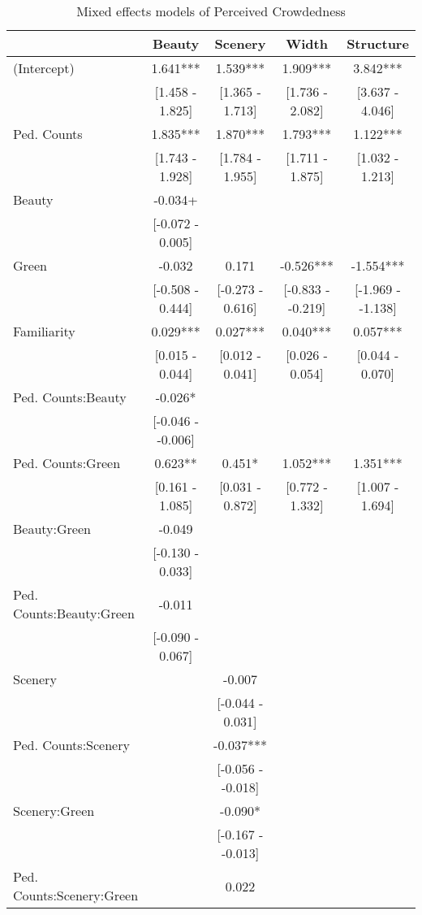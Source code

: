 \begin{table}

\caption{\label{tab:unnamed-chunk-11}Mixed effects models of Perceived Crowdedness \label{tab:models_perceived_crowds}}
\centering
\begin{tabular}[t]{lcccc}
\toprule
  & Beauty & Scenery & Width & Structure\\
\midrule
(Intercept) & 1.641*** & 1.539*** & 1.909*** & 3.842***\\
 & {}[1.458 - 1.825] & {}[1.365 - 1.713] & {}[1.736 - 2.082] & {}[3.637 - 4.046]\\
Ped. Counts & 1.835*** & 1.870*** & 1.793*** & 1.122***\\
 & {}[1.743 - 1.928] & {}[1.784 - 1.955] & {}[1.711 - 1.875] & {}[1.032 - 1.213]\\
Beauty & -0.034+ &  &  & \\
 & {}[-0.072 - 0.005] &  &  & \\
Green & -0.032 & 0.171 & -0.526*** & -1.554***\\
 & {}[-0.508 - 0.444] & {}[-0.273 - 0.616] & {}[-0.833 - -0.219] & {}[-1.969 - -1.138]\\
Familiarity & 0.029*** & 0.027*** & 0.040*** & 0.057***\\
 & {}[0.015 - 0.044] & {}[0.012 - 0.041] & {}[0.026 - 0.054] & {}[0.044 - 0.070]\\
Ped. Counts:Beauty & -0.026* &  &  & \\
 & {}[-0.046 - -0.006] &  &  & \\
Ped. Counts:Green & 0.623** & 0.451* & 1.052*** & 1.351***\\
 & {}[0.161 - 1.085] & {}[0.031 - 0.872] & {}[0.772 - 1.332] & {}[1.007 - 1.694]\\
Beauty:Green & -0.049 &  &  & \\
 & {}[-0.130 - 0.033] &  &  & \\
Ped. Counts:Beauty:Green & -0.011 &  &  & \\
 & {}[-0.090 - 0.067] &  &  & \\
Scenery &  & -0.007 &  & \\
 &  & {}[-0.044 - 0.031] &  & \\
Ped. Counts:Scenery &  & -0.037*** &  & \\
 &  & {}[-0.056 - -0.018] &  & \\
Scenery:Green &  & -0.090* &  & \\
 &  & {}[-0.167 - -0.013] &  & \\
Ped. Counts:Scenery:Green &  & 0.022 &  & \\

\end{tabular}
\end{table}
